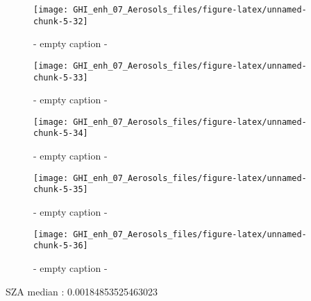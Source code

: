 \documentclass[
  10pt,
  a4paper,oneside]{article}
\begin{document}
\begin{figure}[H]

{\centering \texttt{[image: GHI\_enh\_07\_Aerosols\_files/figure-latex/unnamed-chunk-5-32]} 

}

\caption{ - empty caption - }\label{fig:unnamed-chunk-5-32}
\end{figure}
\begin{figure}[H]

{\centering \texttt{[image: GHI\_enh\_07\_Aerosols\_files/figure-latex/unnamed-chunk-5-33]} 

}

\caption{ - empty caption - }\label{fig:unnamed-chunk-5-33}
\end{figure}
\begin{figure}[H]

{\centering \texttt{[image: GHI\_enh\_07\_Aerosols\_files/figure-latex/unnamed-chunk-5-34]} 

}

\caption{ - empty caption - }\label{fig:unnamed-chunk-5-34}
\end{figure}
\begin{figure}[H]

{\centering \texttt{[image: GHI\_enh\_07\_Aerosols\_files/figure-latex/unnamed-chunk-5-35]} 

}

\caption{ - empty caption - }\label{fig:unnamed-chunk-5-35}
\end{figure}
\begin{figure}[H]

{\centering \texttt{[image: GHI\_enh\_07\_Aerosols\_files/figure-latex/unnamed-chunk-5-36]} 

}

\caption{ - empty caption - }\label{fig:unnamed-chunk-5-36}
\end{figure}

SZA median : 0.00184853525463023
\end{document}
